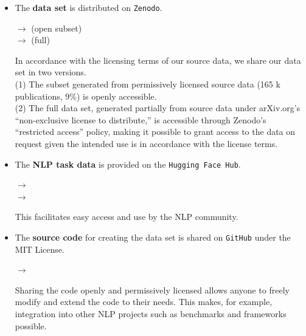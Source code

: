 \begin{itemize}
    \item The \textbf{data set} is distributed on \texttt{Zenodo}.\\
        \begin{small}
        $\rightarrow$ (open subset)\\
        $\rightarrow$ (full)\\
        \end{small}
        In accordance with the licensing terms of our source data, we share our data set in two versions.\\
        (1) The subset generated from permissively licensed source data (165 k publications, 9\%) is openly accessible.\\
        (2) The full data set, generated partially from source data under arXiv.org's ``non-exclusive license to distribute,'' is accessible through Zenodo's ``restricted access'' policy,
making it possible to grant access to the data on request given the intended use is in accordance with the license terms.
    \item The \textbf{NLP task data} is provided on the \texttt{Hugging Face Hub}.\\
        \begin{small}
        $\rightarrow$\\
        $\rightarrow$\\
        \end{small}
        This facilitates easy access and use by the NLP community.
    \item The \textbf{source code} for creating the data set is shared on \texttt{GitHub} under the MIT License.\\
        \begin{small}
        $\rightarrow$\\
        \end{small}
        Sharing the code openly and permissively licensed allows anyone to freely modify and extend the code to their needs. This makes, for example, integration into other NLP projects such as benchmarks and frameworks possible.
\end{itemize}

